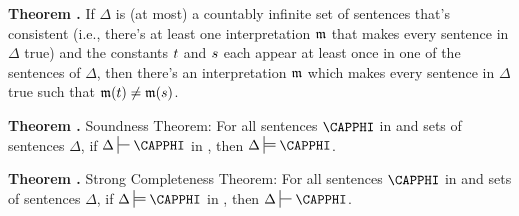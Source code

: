 \begin{majorILnc}{\textbf{Theorem .}}
If $\Delta$ is (at most) a countably infinite set of \GQL{} sentences that's consistent (i.e., there's at least one interpretation $\mathfrak{m}$ that makes every sentence in $\Delta$ true) and the constants $t$ and $s$ each appear at least once in one of the sentences of $\Delta$, then there's an interpretation $\mathfrak{m}$ which makes every sentence in $\Delta$ true such that $\mathfrak{m}(t)\neq\mathfrak{m}(s)$.
\end{majorILnc}

\begin{majorILnc}{\textbf{Theorem .} \GQDI{} Soundness Theorem:}
For all sentences $\CAPPHI$ in \GQLI{} and sets of sentences $\Delta$, if $\Delta\sststile{}{}\CAPPHI$ in \GQDI{}, then $\Delta\sdtstile{}{}\CAPPHI$.
\end{majorILnc}

\begin{majorILnc}{\textbf{Theorem .} \GQDI{} Strong Completeness Theorem:}
For all sentences $\CAPPHI$ in \GQLI{} and sets of sentences $\Delta$, if $\Delta\sdtstile{}{}\CAPPHI$ in \GQDI{}, then $\Delta\sststile{}{}\CAPPHI$.
\end{majorILnc}

